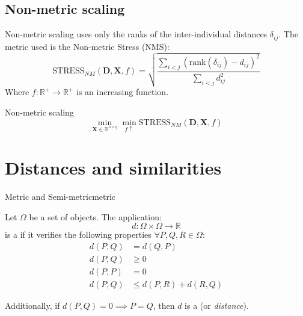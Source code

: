 \subsection{Non-metric scaling}
Non-metric scaling uses only the ranks of the inter-individual distances $\delta_{ij}$.
The metric used is the Non-metric Stress (NMS):
\begin{equation*}
	\text{STRESS}_{NM}(\boldsymbol{D}, \boldsymbol{X}, f) = \sqrt{\frac
	{\sum_{i<j}(\text{rank}(\delta_{ij}) - d_{ij})^2}
	{\sum_{i<j}d_{ij}^2}
	}
\end{equation*}
Where $f: \mathds{R}^+ \to \mathds{R}^+$ is an increasing function.

\begin{problem}{Non-metric scaling}{}
\begin{equation*}
	\min_{\boldsymbol{X} \in \mathds{R}^{n\times q}} \min_{f\uparrow} \text{STRESS}_{NM}(\boldsymbol{D}, \boldsymbol{X}, f)
\end{equation*}
\end{problem}

\section{Distances and similarities}

\begin{definition}{Metric and Semi-metric}{metric}

	Let $\Omega$ be a set of objects. The application:
	\begin{equation*}
		d: \Omega \times \Omega \to \mathds{R}
	\end{equation*}
	is a  if it verifies the following properties $\forall P, Q, R \in \Omega$:
	\begin{align*}
		d(P, Q) & = d(Q, P) \tag{symmetry}                         \\
		d(P, Q) & \geq 0 \tag{non-negativity}                      \\
		d(P, P) & = 0 \tag{identity}                               \\
		d(P, Q) & \leq d(P, R) + d(R, Q) \tag{triangle inequality}
	\end{align*}

	\begin{marker}
		Additionally, if $d(P, Q) = 0 \implies P = Q$, then $d$ is a  (or \emph{distance}).
	\end{marker}
\end{definition}

